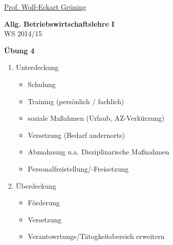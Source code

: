 \documentclass[12pt,a4paper]{scrreprt}
\begin{document}
 
\begin{flushleft}
\href{mailto:gruening@informatik.htw-dresden.de}{Prof. Wolf-Eckart Grüning}
\end{flushleft}

\begin{center}
\large{\textbf{ Allg. Betriebswirtschaftslehre I}} \\
WS 2014/15 \end{center}

\begin{center}\large{\textbf{ Übung 4 }} \end{center}

\bigskip


\begin{enumerate}

\item Unterdeckung

\begin{itemize}
\item Schulung
\item Training (persönlich / fachlich)
\item soziale Maßahmen (Urlaub, AZ-Verkürzung)
\item Versetzung (Bedarf andernorts)
\item Abmahnung u.a. Disziplinarische Maßnahmen
\item Personalfreistellung/-Freisetzung
\end{itemize}

\item Überdeckung

\begin{itemize}
\item Förderung
\item Versetzung
\item Verantowrtungs/Tätogkeitsbereich erweitern

\end{itemize}


\end{enumerate}

\end{document}
